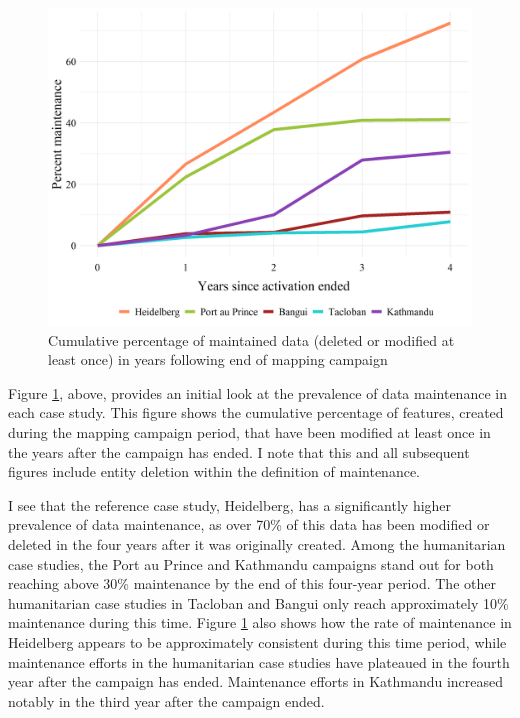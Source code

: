 \begin{figure} %
    \centering %
    \includegraphics[width = \textwidth]{Images/totmaint.png} %
    \caption[Percent of total maintained data over time.]{Cumulative percentage of maintained data (deleted or modified at least once) in years following end of mapping campaign} %
    \label{fig:tot} %
\end{figure}

Figure \ref{fig:tot}, above, provides an initial look at the prevalence of data maintenance in each case study. This figure shows the cumulative percentage of features, created during the mapping campaign period, that have been modified at least once in the years after the campaign has ended. I note that this and all subsequent figures include entity deletion within the definition of maintenance. 

I see that the reference case study, Heidelberg, has a significantly higher prevalence of data maintenance, as over 70\% of this data has been modified or deleted in the four years after it was originally created. Among the humanitarian case studies, the Port au Prince and Kathmandu campaigns stand out for both reaching above 30\% maintenance by the end of this four-year period. The other humanitarian case studies in Tacloban and Bangui only reach approximately 10\% maintenance during this time. Figure \ref{fig:tot} also shows how the rate of maintenance in Heidelberg appears to be approximately consistent during this time period, while maintenance efforts in the humanitarian case studies have plateaued in the fourth year after the campaign has ended. Maintenance efforts in Kathmandu increased notably in the third year after the campaign ended.

